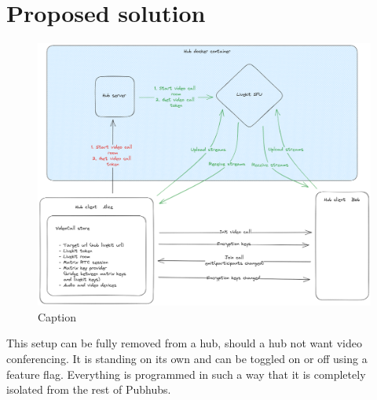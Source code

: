 \documentclass{report}
\begin{document}


    \chapter{Proposed solution}

    \begin{figure}
        \centering
        \includegraphics[width=\textwidth]{img/PH_videocall.excalidraw.png}
        \caption{Caption}
        \label{fig:video-conference-setup}
    \end{figure}

    This setup can be fully removed from a hub, should a hub not want video conferencing. It is standing on its own and
    can be toggled on or off using a feature flag. Everything is programmed in such a way that it is completely isolated
    from the rest of Pubhubs.
\end{document}
